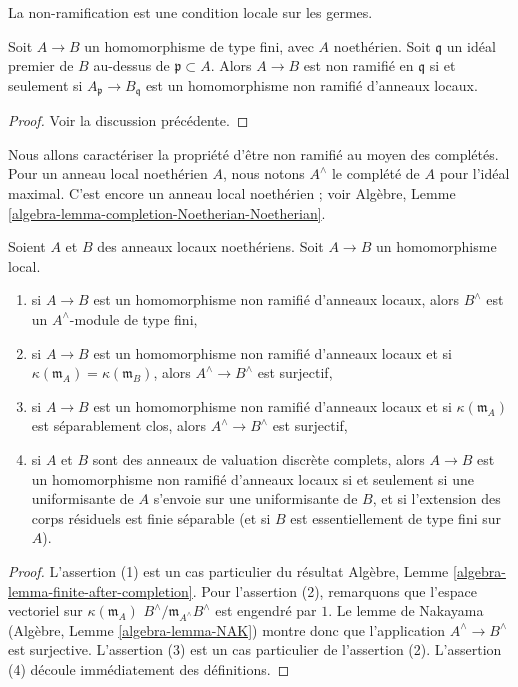 \begin{lemma}
\label{lemma-characterize-unramified-Noetherian}
\begin{slogan}
La non-ramification est une condition locale sur les germes.
\end{slogan}
Soit $A \to B$ un homomorphisme de type fini, avec $A$ noethérien.
Soit $\mathfrak q$ un idéal premier de $B$ au-dessus de $\mathfrak p \subset A$.
Alors $A \to B$ est non ramifié en $\mathfrak q$ si et seulement si
$A_{\mathfrak p} \to B_{\mathfrak q}$ est un homomorphisme non ramifié
d'anneaux locaux.
\end{lemma}

\begin{proof}
Voir la discussion précédente.
\end{proof}

\noindent
Nous allons caractériser la propriété d'être non ramifié au moyen
des complétés. Pour un anneau local noethérien $A$,
nous notons $A^\wedge$ le complété de $A$ pour
l'idéal maximal. C'est encore un anneau local noethérien ; voir
Algèbre, Lemme \ref{algebra-lemma-completion-Noetherian-Noetherian}.

\begin{lemma}
\label{lemma-unramified-completions}
Soient $A$ et $B$ des anneaux locaux noethériens.
Soit $A \to B$ un homomorphisme local.
\begin{enumerate}
\item si $A \to B$ est un homomorphisme non ramifié d'anneaux locaux,
alors $B^\wedge$ est un $A^\wedge$-module de type fini,
\item si $A \to B$ est un homomorphisme non ramifié d'anneaux locaux et si
$\kappa(\mathfrak m_A) = \kappa(\mathfrak m_B)$,
alors $A^\wedge \to B^\wedge$ est surjectif,
\item si $A \to B$ est un homomorphisme non ramifié d'anneaux locaux
et si $\kappa(\mathfrak m_A)$
est séparablement clos, alors $A^\wedge \to B^\wedge$ est surjectif,
\item si $A$ et $B$ sont des anneaux de valuation discrète complets, alors
$A \to B$ est un homomorphisme non ramifié d'anneaux locaux
si et seulement si une uniformisante de $A$ s'envoie sur une uniformisante de $B$,
et si l'extension des corps résiduels est finie séparable (et si $B$ est
essentiellement de type fini sur $A$).
\end{enumerate}
\end{lemma}

\begin{proof}
L'assertion (1) est un cas particulier du résultat
Algèbre, Lemme \ref{algebra-lemma-finite-after-completion}.
Pour l'assertion (2), remarquons que l'espace vectoriel sur $\kappa(\mathfrak m_A)$
$B^\wedge/\mathfrak m_{A^\wedge}B^\wedge$
est engendré par $1$. Le lemme de Nakayama
(Algèbre, Lemme \ref{algebra-lemma-NAK}) montre donc que l'application
$A^\wedge \to B^\wedge$ est surjective.
L'assertion (3) est un cas particulier de l'assertion (2).
L'assertion (4) découle immédiatement des définitions.
\end{proof}

